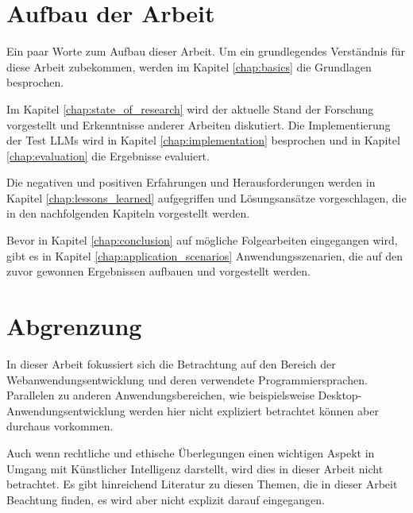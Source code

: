\section{Aufbau der Arbeit}
Ein paar Worte zum Aufbau dieser Arbeit. Um ein grundlegendes Verständnis für diese Arbeit zubekommen, werden im Kapitel \ref{chap:basics} die Grundlagen besprochen.\vspace{0.2cm}

Im Kapitel \ref{chap:state_of_research} wird der aktuelle Stand der Forschung vorgestellt und Erkenntnisse anderer Arbeiten diskutiert. Die Implementierung der Test LLMs wird in Kapitel \ref{chap:implementation} besprochen und in Kapitel \ref{chap:evaluation} die Ergebnisse evaluiert.\vspace{0.2cm}

Die negativen und positiven Erfahrungen und Herausforderungen werden in Kapitel \ref{chap:lessons_learned} aufgegriffen und Lösungsansätze vorgeschlagen, die in den nachfolgenden Kapiteln vorgestellt werden.\vspace{0.2cm}

Bevor in Kapitel \ref{chap:conclusion} auf mögliche Folgearbeiten eingegangen wird, gibt es in Kapitel \ref{chap:application_scenarios} Anwendungsszenarien, die auf den zuvor gewonnen Ergebnissen aufbauen und vorgestellt werden.


\section{Abgrenzung}
In dieser Arbeit fokussiert sich die Betrachtung auf den Bereich der Webanwendungsentwicklung und deren verwendete Programmiersprachen. Parallelen zu anderen Anwendungsbereichen, wie beispielsweise Desktop-Anwendungsentwicklung werden hier nicht expliziert betrachtet können aber durchaus vorkommen.\vspace{0.2cm}

Auch wenn rechtliche und ethische Überlegungen einen wichtigen Aspekt in Umgang mit Künstlicher Intelligenz darstellt, wird dies in dieser Arbeit nicht betrachtet. Es gibt hinreichend Literatur zu diesen Themen, die in dieser Arbeit Beachtung finden, es wird aber nicht explizit darauf eingegangen.

